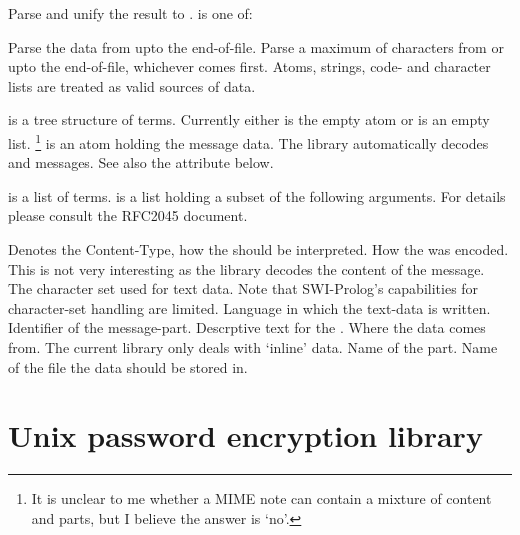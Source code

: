 \documentclass[11pt]{article}
\begin{document}
\begin{description}
Parse  and unify the result to .   is
one of:

\begin{description}
Parse the data from  upto the end-of-file.
Parse a maximum of  characters from  or
upto the end-of-file, whichever comes first.
Atoms, strings, code- and character lists are treated as valid
sources of data.
\end{description}

 is a tree structure of  terms.  Currently either  is the empty atom
or  is an empty list.%
	\footnote{It is unclear to me whether a MIME note can contain
		  a mixture of content and parts, but I believe the
		  answer is `no'.}
 is an atom holding the message data. The library
automatically decodes  and 
messages.  See also the  attribute below.

  is
a list of  terms.  is a list holding
a subset of the following arguments. For details please consult the
RFC2045 document.

\begin{description}
Denotes the Content-Type, how the  should be interpreted.
How the  was encoded.  This is not very interesting as the
library decodes the content of the message.
The character set used for text data. Note that SWI-Prolog's
capabilities for character-set handling are limited.
Language in which the text-data is written.
Identifier of the message-part.
Descrptive text for the .
Where the data comes from.  The current library only deals with
`inline' data.
Name of the part.
Name of the file the data should be stored in.
\end{description}
\end{description}

\section{Unix password encryption library}
\end{document}
